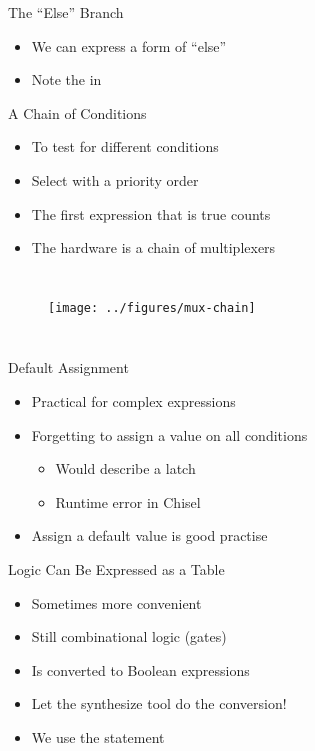 \begin{frame}[fragile]{The ``Else'' Branch}
\begin{itemize}
\item We can express a form of ``else''
\item Note the  in 
\end{itemize}
\end{frame}



\begin{frame}[fragile]{A Chain of Conditions}
\begin{itemize}
\item To test for different conditions
\item Select with a priority order
\item The first expression that is true counts
\item The hardware is a chain of multiplexers
\end{itemize}
\begin{columns}
\begin{figure}
  \texttt{[image: ../figures/mux-chain]}
\end{figure}
\end{columns}
\end{frame}

\begin{frame}[fragile]{Default Assignment}
\begin{itemize}
\item Practical for complex expressions
\item Forgetting to assign a value on all conditions
\begin{itemize}
\item Would describe a latch
\item Runtime error in Chisel
\end{itemize}
\item Assign a default value is good practise
\end{itemize}
\end{frame}

\begin{frame}[fragile]{Logic Can Be Expressed as a Table}
\begin{itemize}
\item Sometimes more convenient
\item Still combinational logic (gates)
\item Is converted to Boolean expressions
\item Let the synthesize tool do the conversion!
\item We use the  statement
\end{itemize}
\end{frame}


